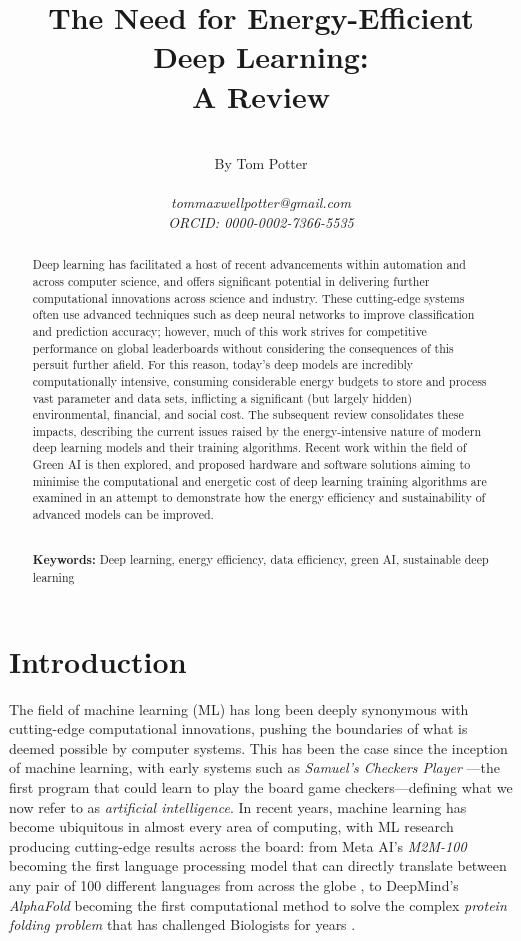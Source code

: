 \documentclass[a4paper, 12pt]{article}
\title{The Need for Energy-Efficient Deep Learning: \\ A Review}
\author{\\By Tom Potter \\\\ \footnotesize{\emph{tommaxwellpotter@gmail.com}} \\ \footnotesize{\emph{ORCID: 0000-0002-7366-5535}}}
\date{}
\begin{document}
    
    \maketitle

    \begin{abstract}
        Deep learning has facilitated a host of recent advancements within automation and across computer science, and offers significant potential in delivering further computational innovations across science and industry. These cutting-edge systems often use advanced techniques such as deep neural networks to improve classification and prediction accuracy; however, much of this work strives for competitive performance on global leaderboards without considering the consequences of this persuit further afield. For this reason, today's deep models are incredibly computationally intensive, consuming considerable energy budgets to store and process vast parameter and data sets, inflicting a significant (but largely hidden) environmental, financial, and social cost. The subsequent review consolidates these impacts, describing the current issues raised by the energy-intensive nature of modern deep learning models and their training algorithms. Recent work within the field of Green AI is then explored, and proposed hardware and software solutions aiming to minimise the computational and energetic cost of deep learning training algorithms are examined in an attempt to demonstrate how the energy efficiency and sustainability of advanced models can be improved. 
        
        \textbf{\\Keywords:} Deep learning, energy efficiency, data efficiency, green AI, sustainable deep learning
    \end{abstract}
    
    \newpage
    \tableofcontents
    \newpage

    \section{Introduction}

    The field of machine learning (ML) has long been deeply synonymous with cutting-edge computational innovations, pushing the boundaries of what is deemed possible by computer systems. This has been the case since the inception of machine learning, with early systems such as \emph{Samuel's Checkers Player} \cite{samuel-1959}---the first program that could learn to play the board game checkers---defining what we now refer to as \emph{artificial intelligence}. In recent years, machine learning has become ubiquitous in almost every area of computing, with ML research producing cutting-edge results across the board: from Meta AI's \emph{M2M-100} becoming the first language processing model that can directly translate between any pair of 100 different languages from across the globe \cite{fan-2020a}, to DeepMind's \emph{AlphaFold} becoming the first computational method to solve the complex \emph{protein folding problem} that has challenged Biologists for years \cite{jumper-2021}. 
\end{document}
